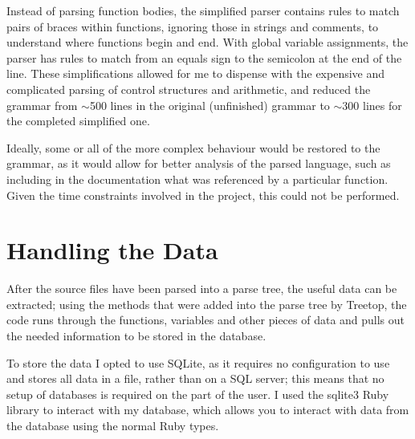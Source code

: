     Instead of parsing function bodies, the simplified parser contains rules to
    match pairs of braces within functions, ignoring those in strings and
    comments, to understand where functions begin and end. With global variable
    assignments, the parser has rules to match from an equals sign to the
    semicolon at the end of the line. These simplifications allowed for me to
    dispense with the expensive and complicated parsing of control structures
    and arithmetic, and reduced the grammar from ${\sim}$500 lines in the
    original (unfinished) grammar to ${\sim}$300 lines for the completed
    simplified one.

    Ideally, some or all of the more complex behaviour would be restored to the
    grammar, as it would allow for better analysis of the parsed language, such
    as including in the documentation what was referenced by a particular
    function. Given the time constraints involved in the project, this could not
    be performed.

\section{Handling the Data}
After the source files have been parsed into a parse tree, the useful data can
be extracted; using the methods that were added into the parse tree by Treetop,
the code runs through the functions, variables and other pieces of data and
pulls out the needed information to be stored in the database.

To store the data I opted to use SQLite, as it requires no configuration to use
and stores all data in a file, rather than on a SQL server; this means that no
setup of databases is required on the part of the user. I used the
sqlite3\cite{website:sqlite} Ruby library to interact with my database, which
allows you to interact with data from the database using the normal Ruby types.

\begin{center}
  \vspace*{5mm}
\end{center}

